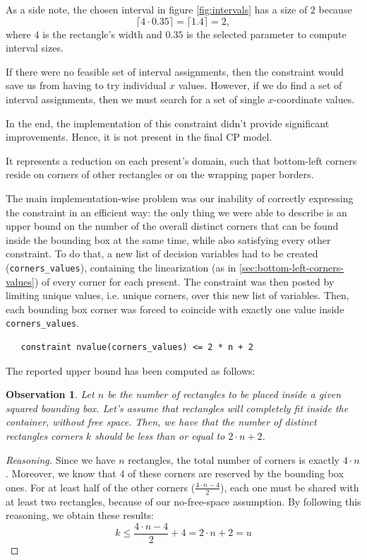 \documentclass[a4paper,10pt]{article}
\newcounter{subsubsubsection}[subsubsection]
\newtheorem{theorem}{Observation}
\begin{document}
As a side note, the chosen interval in figure \ref{fig:intervals} has a size of $2$ because
$$ \lceil 4 \cdot 0.35 \rceil = \lceil 1.4 \rceil = 2,$$
where $4$ is the rectangle's width and $0.35$ is the selected parameter to compute interval sizes.

If there were no feasible set of interval assignments, then the constraint would save us from having to try individual $x$ values. However, if we do find a set of interval assignments, then we must search for a set of single $x$-coordinate values.

In the end, the implementation of this constraint didn't provide significant improvements. Hence, it is not present in the final CP model.

 \label{sec:anchor-points-v1}
It represents a reduction on each present's domain, such that bottom-left corners reside on corners of other rectangles or on the wrapping paper borders.

The main implementation-wise problem was our inability of correctly expressing the constraint in an efficient way: the only thing we were able to describe is an upper bound on the number of the overall distinct corners that can be found inside the bounding box at the same time, while also satisfying every other constraint.
To do that, a new list of decision variables had to be created (\texttt{corners\_values}), containing the linearization (as in \ref{sec:bottom-left-corners-values}) of every corner for each present.
The constraint was then posted by limiting unique values, i.e. unique corners, over this new list of variables. Then, each bounding box corner was forced to coincide with exactly one value inside \texttt{corners\_values}.

\begin{verbatim}
   constraint nvalue(corners_values) <= 2 * n + 2
\end{verbatim}

The reported upper bound has been computed as follows:
\begin{theorem}
   Let $n$ be the number of rectangles to be placed inside a given squared bounding box.
   Let's assume that rectangles will completely fit inside the container, without free space.
   Then, we have that the number of distinct rectangles corners $k$ should be less than or equal to $2\cdot n + 2$.
\end{theorem}
\begin{proof}[Reasoning]
   Since we have $n$ rectangles, the total number of corners is exactly $4 \cdot n$. Moreover, we know that $4$ of these corners are reserved by the bounding box ones.
   For at least half of the other corners ($\frac{4 \cdot n - 4}{2}$), each one must be shared with at least two rectangles, because of our no-free-space assumption.
   By following this reasoning, we obtain these results:
   $$
      k \leq \frac{4 \cdot n - 4}{2} + 4 = 2\cdot n + 2 = u
   $$
\end{proof}
\end{document}
